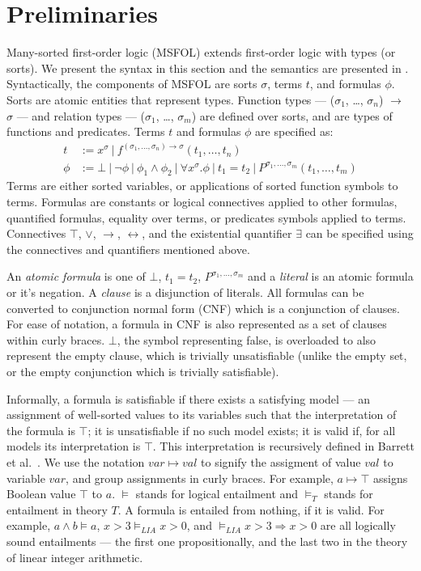 \documentclass[11pt]{article}
\begin{document}
\section{Preliminaries}
\label{sec:prelims}
	Many-sorted first-order logic (MSFOL)
	extends first-order logic with 
	types (or sorts). We present the 
	syntax in this section and the 
	semantics are presented in
	\cite{Barrett2018}. Syntactically, 
	the components of MSFOL are sorts 
	$\sigma$, terms $t$, and 
	formulas $\phi$. Sorts are 
	atomic entities that 
	represent types. Function types 
	--- ($\sigma_1$, \ldots, $\sigma_n$) 
	$\to$ $\sigma$ ---
	and relation types 
	--- ($\sigma_1$, \ldots, $\sigma_m$)
	are defined over sorts, and 
	are types of functions and 
	predicates. Terms $t$ and 
	formulas $\phi$ are specified as:
	\begin{align*}
	t &:= x^{\sigma}\ |\ 
	f^{(\sigma_1, \ldots, \sigma_n) \to 
		\sigma}	(t_1, \ldots, t_n)\\
	\phi &:= \bot\ |\ \neg \phi\ |\ 
	\phi_1 \land \phi_2\ |\ \forall 
	x^{\sigma} . \phi\ |\ t_1 = t_2
	\ |\ P^{\sigma_1,\ldots,\sigma_m}
	(t_1, \ldots, t_m)
	\end{align*}
	Terms are either sorted variables, 
	or applications of sorted function
	symbols to terms.
	Formulas are constants or logical 
	connectives applied to other 
	formulas, quantified formulas, 
	equality over terms, or predicates
	symbols applied to terms. Connectives 
	$\top$, $\lor$, $\to$, 
	$\leftrightarrow$, and the 
	existential	quantifier $\exists$ 
	can be specified using the connectives 
	and quantifiers mentioned above.
	
	An \textit{atomic formula} is one 
	of $\bot$, $t_1 = t_2$, 
	$P^{\sigma_1,\ldots,\sigma_m}$ and a 
	\textit{literal} is an atomic 
	formula or it's negation. 
	A \textit{clause} is a 
	disjunction of literals. All formulas 
	can be converted to conjunction normal 
	form (CNF) which is a conjunction of 
	clauses. For ease of notation, 
	a formula in CNF is also represented
	as a set of clauses within curly 
	braces. $\bot$, the symbol
	representing false, 
	is overloaded to also represent
	the empty clause, which is trivially
	unsatisfiable (unlike the empty set,
	or the empty conjunction which is 
	trivially satisfiable).
	
	Informally, a formula is satisfiable
	if there exists a satisfying model 
	--- an assignment of well-sorted 
	values to its variables such that 
	the interpretation of the formula 
	is $\top$; it is unsatisfiable if 
	no such model exists; it is valid
	if, for all models its interpretation
	is $\top$. This interpretation 
	is recursively defined in 
	Barrett et al.~\cite{Barrett2018}.
	We use the notation
	$var \mapsto val$ to signify the 
	assigment of value $val$ to 
	variable $var$, and group 
	assignments in curly braces. 
	For example, 
	$a \mapsto \top$ assigns Boolean value 
	$\top$ to $a$. $\models$ stands for 
	logical entailment and $\models_T$ 
	stands for entailment in theory $T$. 
	A formula is entailed from nothing, 
	if it is valid. For example, 
	$a \land b \models a$,
	$x > 3 \models_{LIA} x > 0$, and 
	$\models_{LIA} x > 3 \Rightarrow 
	x > 0$ are all logically sound 
	entailments --- the first one 
	propositionally, and the
	last two in the theory of linear 
	integer arithmetic.
	
\end{document}

